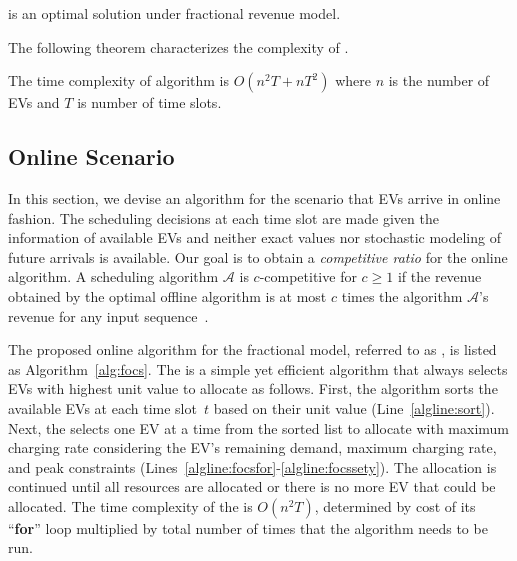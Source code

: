 \begin{thm}
	\label{cor:1}
	\fcs is an optimal solution under fractional revenue model.
\end{thm}

The following theorem characterizes the complexity of \fcs.

\begin{thm}
	\label{thm:complexity}
	The time complexity of \fcs algorithm is $O(n^2T+nT^2)$ where $n$ is the number of EVs and $T$ is number of time slots.
\end{thm}


\subsection{Online Scenario}
\label{sec:fonline}
In this section, we devise an algorithm for the scenario that EVs arrive in online fashion. The scheduling decisions at each time slot are made given the information of available EVs and neither exact values nor stochastic modeling of future arrivals is available. Our goal is to obtain a \emph{competitive ratio} for the online algorithm. A scheduling algorithm $\mathcal{A}$ is $c$-competitive for $c\geq 1$ if the revenue obtained by the optimal offline algorithm is at most $c$ times the algorithm $\mathcal{A}$'s revenue for any input sequence~\cite{borodin2005online}.

The proposed online algorithm for the fractional model, referred to as \focs, is listed as Algorithm~\ref{alg:focs}. The \focs is a simple yet efficient algorithm that always selects EVs with highest unit value to allocate as follows. First, the algorithm sorts the available EVs at each time slot~$t$ based on their unit value (Line~\ref{algline:sort}).  Next, the \focs selects one EV at a time from the sorted list to allocate with maximum charging rate considering the EV's remaining demand, maximum charging rate, and peak constraints (Lines~\ref{algline:focsfor}-\ref{algline:focssety}). The allocation is continued until all resources are allocated or there is no more EV that could be allocated. 
The time complexity of the \focs is $O(n^2T)$, determined by cost of its ``\textbf{for}'' loop multiplied by total number of times that the algorithm needs to be run.

